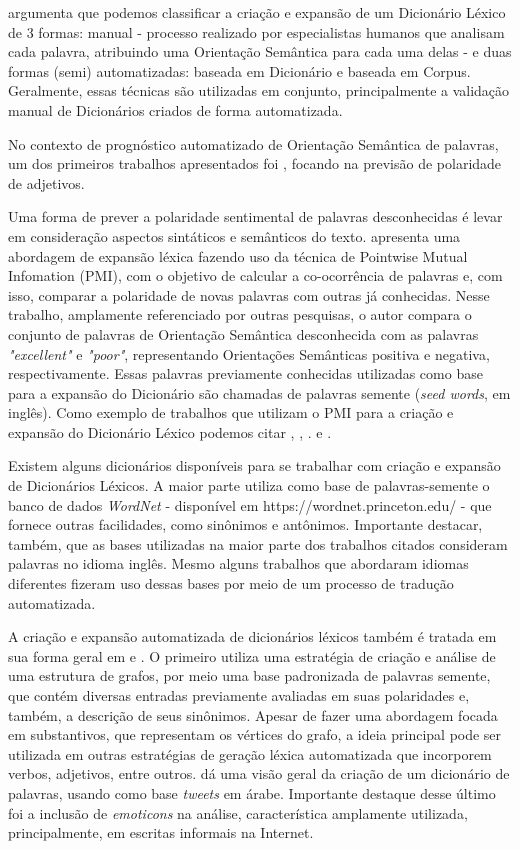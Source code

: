\documentclass[12pt]{article}
\begin{document}
\cite{kdir16} argumenta que podemos classificar a criação e expansão de um Dicionário Léxico de 3 formas: manual -  processo realizado por especialistas humanos que analisam cada palavra, atribuindo uma Orientação Semântica para cada uma delas -  e duas formas (semi) automatizadas: baseada em Dicionário e baseada em Corpus. Geralmente, essas técnicas são utilizadas em conjunto, principalmente a validação manual de Dicionários criados de forma automatizada.

No contexto de prognóstico automatizado de Orientação Semântica de palavras, um dos primeiros trabalhos apresentados foi \cite{Hatzivassiloglou}, focando na previsão de polaridade de adjetivos.

Uma forma de prever a polaridade sentimental de palavras desconhecidas é levar em consideração aspectos sintáticos e semânticos do texto. \cite{Turney2002} apresenta uma abordagem de expansão léxica fazendo uso da técnica de Pointwise Mutual Infomation (PMI), com o objetivo de calcular a co-ocorrência de palavras e, com isso, comparar a polaridade de novas palavras com outras já conhecidas. Nesse trabalho, amplamente referenciado por outras pesquisas, o autor compara o conjunto de palavras de Orientação Semântica desconhecida com as palavras \emph{ "excellent"} e \emph{"poor"}, representando Orientações Semânticas positiva e negativa, respectivamente. Essas palavras previamente conhecidas utilizadas como base para a expansão do Dicionário são chamadas de palavras semente (\emph{seed words}, em inglês). Como exemplo de trabalhos que utilizam o PMI para a criação e expansão do Dicionário Léxico podemos citar \cite{becker2013}, \cite{Zhou2014}, \cite{Pinto2007}. \cite{Pantel2006} e \cite{kaji}.

Existem alguns dicionários disponíveis para se trabalhar com criação e expansão de Dicionários Léxicos. A maior parte utiliza como base de palavras-semente o banco de dados \emph{WordNet} - disponível em https://wordnet.princeton.edu/ - que fornece outras facilidades, como sinônimos e antônimos. Importante destacar, também, que as bases utilizadas na maior parte dos trabalhos citados consideram palavras no idioma inglês. Mesmo alguns trabalhos que abordaram idiomas diferentes fizeram uso dessas bases por meio de um processo de tradução automatizada.

A criação e expansão automatizada de dicionários léxicos também é tratada em sua forma geral em \cite{widdows2002graph} e \cite{duwairi2015detecting}. O primeiro utiliza uma estratégia de criação e análise de uma estrutura de grafos, por meio uma base padronizada de palavras semente, que contém diversas entradas previamente avaliadas em suas polaridades e, também, a descrição de seus sinônimos. Apesar de fazer uma abordagem focada em substantivos, que representam os vértices do grafo, a ideia principal pode ser utilizada em outras estratégias de geração léxica automatizada que incorporem verbos, adjetivos, entre outros. \cite{duwairi2015detecting} dá uma visão geral da criação de um dicionário de palavras, usando como base \emph{tweets} em árabe. Importante destaque desse último foi a inclusão de \emph{emoticons} na análise, característica amplamente utilizada, principalmente, em escritas informais na Internet.
\end{document}
